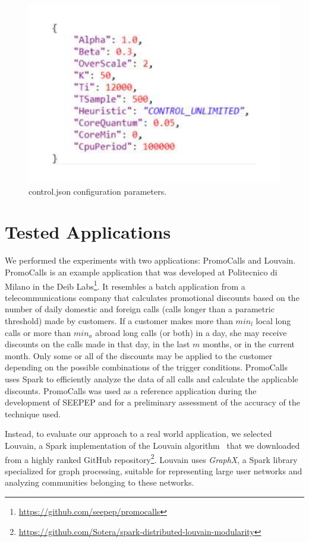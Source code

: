 \begin{figure}[thbp]
	\centering
	\includegraphics[width=\columnwidth]{images/xspark_control_unlimited_parms.pdf}
	\caption{control.json \cSpark configuration parameters.}
	\label{fig:xSparkConfigParms}
\end{figure}

\section{Tested Applications}\label{sec:tested_apps}
We performed the experiments with two applications: PromoCalls and Louvain.
PromoCalls is an example application that was developed at Politecnico di Milano in the Deib Labs\footnote{\url{https://github.com/seepep/promocalls}}.
It resembles a batch application from a telecommunications company that calculates promotional discounts based on the number of daily domestic and foreign calls (calls longer than a parametric threshold) made by customers. 
If a customer makes more than  $min_l$ local long calls or more than $min_a$ abroad long calls (or both) in a day, she may receive discounts on the calls made in that day, in the last $m$ months, or in the current month. 
Only some or all of the discounts may be applied to the customer depending on the possible combinations of the trigger conditions. 
PromoCalls uses Spark to efficiently analyze the data of all calls and calculate the applicable discounts.
PromoCalls was used as a reference application during the development of SEEPEP and for a preliminary assessment of the accuracy of the technique used.

Instead, to evaluate our approach to a real world application, we selected Louvain, a Spark implementation of the Louvain algorithm~\cite{Louvain} that we downloaded from a highly ranked GitHub repository\footnote{\url{https://github.com/Sotera/spark-distributed-louvain-modularity}}. Louvain uses \textit{GraphX}, a Spark library specialized for graph processing, suitable for representing large user networks and analyzing communities belonging to these networks.

